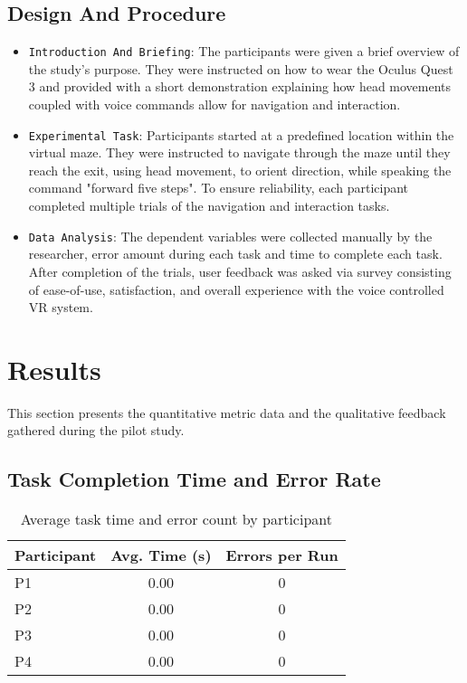 \documentclass[manuscript, screen, review]{acmart}
\begin{document}
\subsection{Design And Procedure}
\begin{itemize}
\item {\texttt{Introduction And Briefing}}: The participants were given a brief overview of the study's purpose. They were instructed on how to wear the Oculus Quest 3 and provided with a short demonstration explaining how head movements coupled with voice commands allow for navigation and interaction.
\item {\texttt{Experimental Task}}: Participants started at a predefined location within the virtual maze. They were instructed to navigate through the maze until they reach the exit, using head movement, to orient direction, while speaking the command "forward five steps". To ensure reliability, each participant completed multiple trials of the navigation and interaction tasks.
\item {\texttt{Data Analysis}}: The dependent variables were collected manually by the researcher, error amount during each task and time to complete each task. After completion of the trials, user feedback was asked via survey consisting of ease-of-use, satisfaction, and overall experience with the voice controlled VR system.  
\end{itemize}

\section{Results}
This section presents the quantitative metric data and the qualitative feedback gathered during the pilot study. 
\subsection{Task Completion Time and Error Rate}
\begin{table}[htbp]
  \caption{Average task time and error count by participant}
  \label{tab:performance}
  \begin{tabular}{lcc}
    \toprule
    Participant & Avg. Time (s) & Errors per Run \\
    \midrule
    P1 & 0.00 & 0 \\
    P2 & 0.00 & 0 \\
    P3 & 0.00 & 0 \\
    P4 & 0.00 & 0 \\
    \bottomrule
  \end{tabular}
\end{table}
\end{document}
